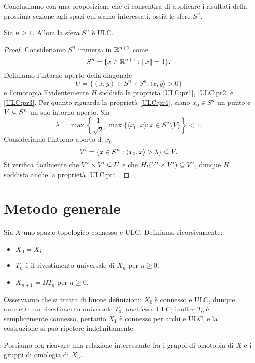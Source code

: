 Concludiamo con una proposizione che ci consentirà di applicare i risultati della prossima sezione agli spazi cui siamo interessati, ossia le sfere \(S^n\).

\begin{proposition}
Sia \(n\ge 1\). Allora la sfera \(S^n\) è ULC.
\end{proposition}
\begin{proof}
Consideriamo \(S^n\) immersa in \(\mathbb{R}^{n+1}\) come
\[
S^n=\{x\in\mathbb{R}^{n+1}:\left\lVert x\right\rVert=1\}.
\]
Definiamo l'intorno aperto della diagonale
\[
U=\{(x,y)\in S^n\times S^n:\langle x,y\rangle>0\}
\]
e l'omotopia
Evidentemente \(H\) soddisfa le proprietà \ref{ULC:pr1}, \ref{ULC:pr2} e \ref{ULC:pr3}. Per quanto riguarda la proprietà \ref{ULC:pr4}, siano \(x_0\in S^n\) un punto e \(V\subseteq S^n\) un suo intorno aperto. Sia
\[
\lambda=\max\left\{\frac{1}{\sqrt{2}},\max\{\langle x_0,x\rangle:x\in S^n\setminus V\}\right\}<1.
\]
Consideriamo l'intorno aperto di \(x_0\)
\[
V'=\{x\in S^n:\langle x_0,x\rangle>\lambda\}\subseteq V.
\]
Si verifica facilmente che \(V'\times V'\subseteq U\) e che \(H_t(V'\times V')\subseteq V'\), dunque \(H\) soddisfa anche la proprietà \ref{ULC:pr4}.
\end{proof}

\section{Metodo generale}

Sia \(X\) uno spazio topologico connesso e ULC. Definiamo ricorsivamente:
\begin{itemize}
\item \(X_0=X\);
\item \(T_n\) è il rivestimento universale di \(X_n\) per \(n\ge 0\);
\item \(X_{n+1}=\Omega T_n\) per \(n\ge 0\).
\end{itemize}
Osserviamo che si tratta di buone definizioni: \(X_0\) è connesso e ULC, dunque ammette un rivestimento universale \(T_0\), anch'esso ULC; inoltre \(T_0\) è semplicemente connesso, pertanto \(X_1\) è connesso per archi e ULC, e la costruzione si può ripetere indefinitamente.

Possiamo ora ricavare una relazione interessante fra i gruppi di omotopia di \(X\) e i gruppi di omologia di \(X_n\).

